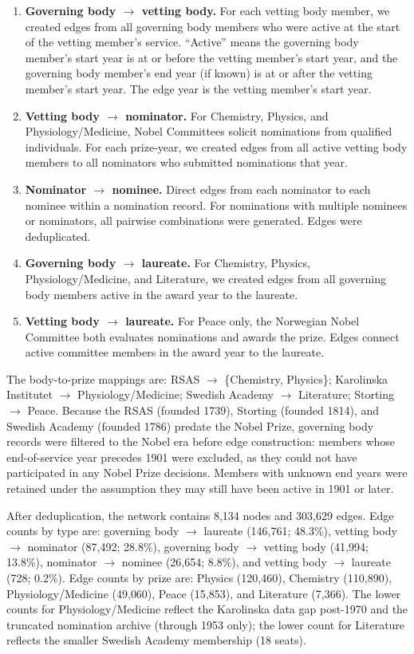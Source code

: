 \documentclass[11pt]{article}
\begin{document}
\begin{enumerate}
    \item \textbf{Governing body $\to$ vetting body.} For each vetting body member, we created edges from all governing body members who were active at the start of the vetting member's service. ``Active'' means the governing body member's start year is at or before the vetting member's start year, and the governing body member's end year (if known) is at or after the vetting member's start year. The edge year is the vetting member's start year.

    \item \textbf{Vetting body $\to$ nominator.} For Chemistry, Physics, and Physiology/Medicine, Nobel Committees solicit nominations from qualified individuals. For each prize-year, we created edges from all active vetting body members to all nominators who submitted nominations that year.

    \item \textbf{Nominator $\to$ nominee.} Direct edges from each nominator to each nominee within a nomination record. For nominations with multiple nominees or nominators, all pairwise combinations were generated. Edges were deduplicated.

    \item \textbf{Governing body $\to$ laureate.} For Chemistry, Physics, Physiology/Medicine, and Literature, we created edges from all governing body members active in the award year to the laureate.

    \item \textbf{Vetting body $\to$ laureate.} For Peace only, the Norwegian Nobel Committee both evaluates nominations and awards the prize. Edges connect active committee members in the award year to the laureate.
\end{enumerate}

The body-to-prize mappings are: RSAS $\to$ \{Chemistry, Physics\}; Karolinska Institutet $\to$ Physiology/Medicine; Swedish Academy $\to$ Literature; Storting $\to$ Peace. Because the RSAS (founded 1739), Storting (founded 1814), and Swedish Academy (founded 1786) predate the Nobel Prize, governing body records were filtered to the Nobel era before edge construction: members whose end-of-service year precedes 1901 were excluded, as they could not have participated in any Nobel Prize decisions. Members with unknown end years were retained under the assumption they may still have been active in 1901 or later.

After deduplication, the network contains 8{,}134 nodes and 303{,}629 edges. Edge counts by type are: governing body $\to$ laureate (146{,}761; 48.3\%), vetting body $\to$ nominator (87{,}492; 28.8\%), governing body $\to$ vetting body (41{,}994; 13.8\%), nominator $\to$ nominee (26{,}654; 8.8\%), and vetting body $\to$ laureate (728; 0.2\%). Edge counts by prize are: Physics (120{,}460), Chemistry (110{,}890), Physiology/Medicine (49{,}060), Peace (15{,}853), and Literature (7{,}366). The lower counts for Physiology/Medicine reflect the Karolinska data gap post-1970 and the truncated nomination archive (through 1953 only); the lower count for Literature reflects the smaller Swedish Academy membership (18 seats).
\end{document}
